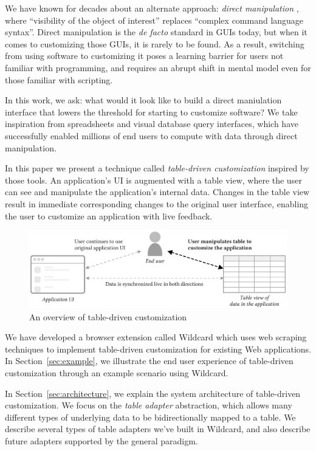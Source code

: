 \documentclass[sigplan,screen,10pt,anonymous,review]{acmart}
\begin{document}
We have known for decades about an alternate approach: \emph{direct
manipulation} \citep{shneiderman1983}, where ``visibility of the object
of interest'' replaces ``complex command language syntax''. Direct
manipulation is the \emph{de facto} standard in GUIs today, but when it
comes to customizing those GUIs, it is rarely to be found. As a result,
switching from using software to customizing it poses a learning barrier
for users not familiar with programming, and requires an abrupt shift in
mental model even for those familiar with scripting.

In this work, we ask: what would it look like to build a direct
maniulation interface that lowers the threshold for starting to
customize software? We take inspiration from spreadsheets and visual
database query interfaces, which have successfully enabled millions of
end users to compute with data through direct manipulation.

In this paper we present a technique called \emph{table-driven
customization} inspired by those tools. An application's UI is augmented
with a table view, where the user can see and manipulate the
application's internal data. Changes in the table view result in
immediate corresponding changes to the original user interface, enabling
the user to customize an application with live feedback.

\begin{figure}
\hypertarget{fig:overview}{%
\centering
\includegraphics[width=\textwidth]{media/overview.eps}
\caption{An overview of table-driven customization}\label{fig:overview}
}
\end{figure}

We have developed a browser extension called Wildcard which uses web
scraping techniques to implement table-driven customization for existing
Web applications. In Section~\ref{sec:example}, we illustrate the end
user experience of table-driven customization through an example
scenario using Wildcard.

In Section~\ref{sec:architecture}, we explain the system architecture of
table-driven customization. We focus on the \emph{table adapter}
abstraction, which allows many different types of underlying data to be
bidirectionally mapped to a table. We describe several types of table
adapters we've built in Wildcard, and also describe future adapters
supported by the general paradigm.
\end{document}
